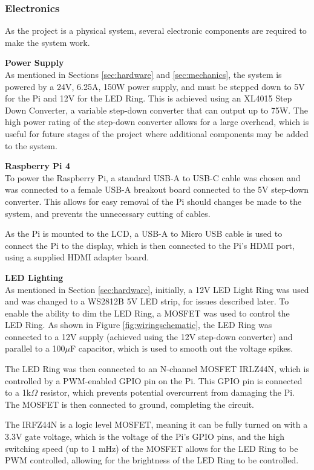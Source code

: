\subsubsection{Electronics}
As the project is a physical system, several electronic components are required to make the system work.

\noindent
\textbf{Power Supply} \\
As mentioned in Sections \ref{sec:hardware} and \ref{sec:mechanics}, the system is powered by a 24V, 6.25A, 150W power supply, and must
be stepped down to 5V for the Pi and 12V for the LED Ring. This is achieved using an XL4015 Step Down Converter\cite{xl4015}, a variable
step-down converter that can output up to 75W.
The high power rating of the step-down converter allows for a large overhead, which is useful for future stages of the project where 
additional components may be added to the system.

\noindent
\textbf{Raspberry Pi 4} \\
To power the Raspberry Pi, a standard USB-A to USB-C cable was chosen and was connected to a female USB-A breakout board connected to the
5V step-down converter. This allows for easy removal of the Pi should changes be made to the system, and prevents the unnecessary
cutting of cables.

As the Pi is mounted to the LCD, a USB-A to Micro USB cable is used to connect the Pi to the display, which is then connected to the
Pi's HDMI port, using a supplied HDMI adapter board.

\noindent
\textbf{LED Lighting} \\
As mentioned in Section \ref{sec:hardware}, initially, a 12V LED Light Ring was used and was changed to a WS2812B 5V LED strip, for issues described 
later. To enable the ability to dim the LED Ring, a MOSFET was used to control the LED Ring. As shown in Figure \ref{fig:wiringschematic}, the LED Ring was connected to a 12V supply (achieved using the 12V step-down converter) and
parallel to a 100$\mu$F capacitor, which is used to smooth out the voltage spikes.

The LED Ring was then connected to an N-channel MOSFET IRLZ44N\cite{irlz44n}, which is controlled by a PWM-enabled GPIO pin on the Pi.
This GPIO pin is connected to a 1k$\Omega$ resistor, which prevents potential overcurrent from damaging the Pi. The MOSFET is then connected to ground, completing the circuit.

The IRFZ44N is a logic level MOSFET, meaning it can be fully turned on with a 3.3V gate voltage, which is the voltage of the Pi's GPIO pins, and the high
switching speed (up to 1 mHz) of the MOSFET allows for the LED Ring to be PWM controlled, allowing for the brightness of the LED Ring to be controlled.